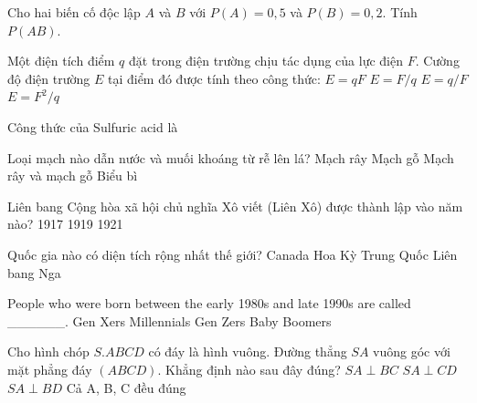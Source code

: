 \begin{ex}
    Cho hai biến cố độc lập $A$ và $B$ với $P(A) = 0,5$ và $P(B) = 0,2$. Tính $P(AB)$.
\end{ex}
\begin{ex}
    Một điện tích điểm $q$ đặt trong điện trường chịu tác dụng của lực điện $F$. Cường độ điện trường $E$ tại điểm đó được tính theo công thức:
    \choice
    {$E = qF$}
    {\True $E = F/q$}
    {$E = q/F$}
    {$E = F^2/q$}

\end{ex}
\begin{ex}
    Công thức của Sulfuric acid là
\end{ex}
\begin{ex}
    Loại mạch nào dẫn nước và muối khoáng từ rễ lên lá?
    \choice
    {Mạch rây}
    {\True Mạch gỗ}
    {Mạch rây và mạch gỗ}
    {Biểu bì}

\end{ex}
\begin{ex}
    Liên bang Cộng hòa xã hội chủ nghĩa Xô viết (Liên Xô) được thành lập vào năm nào?
    \choice
    {1917}
    {1919}
    {1921}
    {}

\end{ex}
\begin{ex}
    Quốc gia nào có diện tích rộng nhất thế giới?
    \choice
    {Canada}
    {Hoa Kỳ}
    {Trung Quốc}
    {\True Liên bang Nga}

\end{ex}
\begin{ex}
    People who were born between the early 1980s and late 1990s are called ______.
    \choice
    {Gen Xers}
    {\True Millennials}
    {Gen Zers}
    {Baby Boomers}

\end{ex}
\begin{ex}
    Cho hình chóp $S.ABCD$ có đáy là hình vuông. Đường thẳng $SA$ vuông góc với mặt phẳng đáy $(ABCD)$. Khẳng định nào sau đây đúng?
    \choice
    {$SA \perp BC$}
    {$SA \perp CD$}
    {$SA \perp BD$}
    {\True Cả A, B, C đều đúng}

\end{ex}
